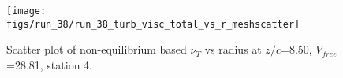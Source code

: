 \begin{figure}[H]
\centering
\texttt{[image: figs/run\_38/run\_38\_turb\_visc\_total\_vs\_r\_meshscatter]}
\caption{Scatter plot of non-equilibrium based $\nu_T$ vs radius at $z/c$=8.50, $V_{free}$=28.81, station 4.}
\label{fig:run_38_turb_visc_total_vs_r_meshscatter}
\end{figure}


